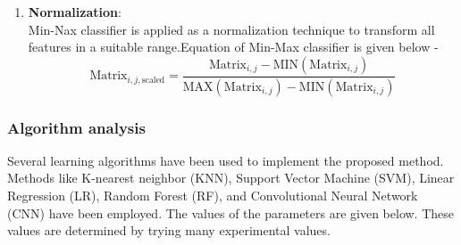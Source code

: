 \documentclass[a4paper,12pt]{article}
\begin{document}
\begin{enumerate}
\begin{itemize}
    \end{itemize}
    \item \textbf{Normalization}:\\
    Min-Nax classifier is applied as a normalization technique to transform all features in a suitable range.Equation of Min-Max classifier is given below - \\
    \begin{equation}
    \text{Matrix}_{i,j,\text{scaled}} = \frac{\text{Matrix}_{i,j} - \text{MIN}(\text{Matrix}_{i,j})}{\text{MAX}(\text{Matrix}_{i,j}) - \text{MIN}(\text{Matrix}_{i,j})}
    \end{equation}
\end{enumerate}

\subsubsection{Algorithm analysis}
Several learning algorithms have been used to implement the proposed method. Methods like K-nearest neighbor (KNN), Support Vector Machine (SVM), Linear Regression (LR), Random Forest (RF), and Convolutional Neural Network (CNN) have been employed. The values of the parameters are given below. These values are determined by trying many experimental values.
\end{document}
